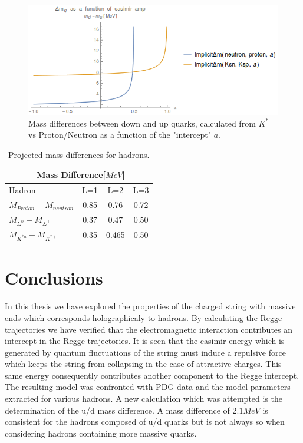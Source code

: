 \documentclass[11pt,a4paper]{article}
\begin{document}
\begin{figure}[h]
\centering
\includegraphics[width=\linewidth]{figures/KaonMassDifferences}
\caption{Mass differences between down and up quarks, calculated from $K^{*\pm}$ vs Proton/Neutron as a function of the "intercept" $a$.}
\label{fig:kaonmassdiff}
\end{figure}

\begin{table}
\centering
\begin{tabular}{|l|c|c|c|}
\hline
\multicolumn{3}{r}{Mass Difference[$MeV$]} \\ \hline
Hadron & L=1 & L=2 & L=3  \\ \hline
$M_{Proton}-M_{neutron}$ & 0.85 & 0.76 & 0.72 \\ \hline
$M_{\Sigma^0}-M_{\Sigma^+}$ & 0.37 & 0.47 & 0.50 \\ \hline
$M_{K^{*n}}-M_{K^{*+}}$ & 0.35 & 0.465 & 0.50 \\ \hline
\end{tabular}
\caption{Projected mass differences for hadrons.}
\label{tab:projectedmassdiff}
\end{table}
\FloatBarrier
\section{Conclusions}

In this thesis we have explored the properties of the charged string with massive ends which corresponds holographicaly to hadrons. By calculating the Regge trajectories we have verified that the electromagnetic interaction contributes an intercept in the Regge trajectories. It is seen that the casimir energy which is generated by quantum fluctuations of the string must induce a repulsive force which keeps the string from collapsing in the case of attractive charges. This same energy consequently contributes another component to the Regge intercept. The resulting model was confronted with PDG data and the model parameters extracted for various hadrons. A new calculation which was attempted is the determination of the u/d mass difference. A mass difference of $2.1 MeV$ is consistent for the hadrons composed of u/d quarks but is not always so when considering hadrons containing more massive quarks.
\end{document}
